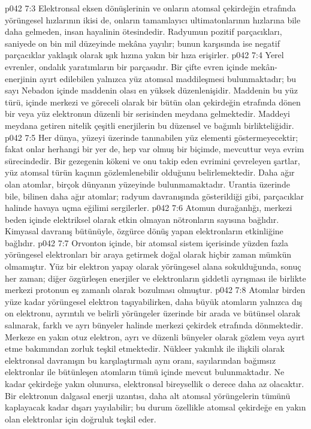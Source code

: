 \vs p042 7:3 Elektronsal eksen dönüşlerinin ve onların atomsal çekirdeğin etrafında yörüngesel hızlarının ikisi de, onların tamamlayıcı ultimatonlarının hızlarına bile daha gelmeden, insan hayalinin ötesindedir. Radyumun pozitif parçacıkları, saniyede on bin mil düzeyinde mekâna yayılır; bunun karşısında ise negatif parçacıklar yaklaşık olarak ışık hızına yakın bir hıza erişirler.
\vs p042 7:4 Yerel evrenler, ondalık yaratımların bir parçasıdır. Bir çifte evren içinde mekân\hyp{}enerjinin ayırt edilebilen yalnızca yüz atomsal maddileşmesi bulunmaktadır; bu sayı Nebadon içinde maddenin olası en yüksek düzenlenişidir. Maddenin bu yüz türü, içinde merkezi ve göreceli olarak bir bütün olan çekirdeğin etrafında dönen bir veya yüz elektronun düzenli bir serisinden meydana gelmektedir. Maddeyi meydana getiren nitelik çeşitli enerjilerin bu düzensel ve bağımlı birlikteliğidir.
\vs p042 7:5 Her dünya, yüzeyi üzerinde tanınabilen yüz elementi göstermeyecektir; fakat onlar herhangi bir yer de, hep var olmuş bir biçimde, mevcuttur veya evrim sürecindedir. Bir gezegenin kökeni ve onu takip eden evrimini çevreleyen şartlar, yüz atomsal türün kaçının gözlemlenebilir olduğunu belirlemektedir. Daha ağır olan atomlar, birçok dünyanın yüzeyinde bulunmamaktadır. Urantia üzerinde bile, bilinen daha ağır atomlar; radyum davranışında gösterildiği gibi, parçacıklar halinde havaya uçma eğilimi sergilerler.
\vs p042 7:6 Atomun durağanlığı, merkezi beden içinde elektriksel olarak etkin olmayan nötronların sayısına bağlıdır. Kimyasal davranış bütünüyle, özgürce dönüş yapan elektronların etkinliğine bağlıdır.
\vs p042 7:7 Orvonton içinde, bir atomsal sistem içerisinde yüzden fazla yörüngesel elektronları bir araya getirmek doğal olarak hiçbir zaman mümkün olmamıştır. Yüz bir elektron yapay olarak yörüngesel alana sokulduğunda, sonuç her zaman; diğer özgürleşen enerjiler ve elektronların şiddetli ayrışması ile birlikte merkezi protonun eş zamanlı olarak bozulması olmuştur.
\vs p042 7:8 Atomlar birden yüze kadar yörüngesel elektron taşıyabilirken, daha büyük atomların yalnızca dış on elektronu, ayrıntılı ve belirli yörüngeler üzerinde bir arada ve bütünsel olarak salınarak, farklı ve ayrı bünyeler halinde merkezi çekirdek etrafında dönmektedir. Merkeze en yakın otuz elektron, ayrı ve düzenli bünyeler olarak gözlem veya ayırt etme bakımından zorluk teşkil etmektedir. Nükleer yakınlık ile ilişkili olarak elektronsal davranışın bu karşılaştırmalı aynı oranı, sayılarından bağımsız elektronlar ile bütünleşen atomların tümü içinde mevcut bulunmaktadır. Ne kadar çekirdeğe yakın olunursa, elektronsal bireysellik o derece daha az olacaktır. Bir elektronun dalgasal enerji uzantısı, daha alt atomsal yörüngelerin tümünü kaplayacak kadar dışarı yayılabilir; bu durum özellikle atomsal çekirdeğe en yakın olan elektronlar için doğruluk teşkil eder.
